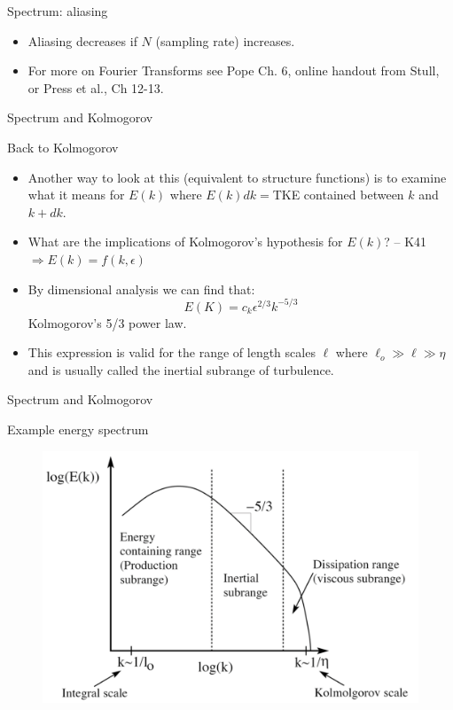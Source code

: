
\begin{frame}{Spectrum: aliasing}
\begin{itemize}
	\item Aliasing decreases if $N$ (sampling rate) increases.
	\item For more on Fourier Transforms see Pope Ch. 6, online handout from Stull, or Press et al., Ch 12-13.
\end{itemize}
\end{frame}

\begin{frame}{Spectrum and Kolmogorov}

Back to Kolmogorov
\begin{itemize}
	\item Another way to look at this (equivalent to structure functions) is to examine what it means for $E(k)$ where $E(k)dk =$TKE contained between $k$ and $k+dk$.
	\item What are the implications of Kolmogorov’s hypothesis for $E(k)$? -- K41$\Rightarrow E(k) = f(k,\epsilon)$
	\item By dimensional analysis we can find that: $$E(K) = c_k \epsilon^{2/3}k^{-5/3}$$ Kolmogorov's 5/3 power law.
	\item This expression is valid for the range of length scales $\ell$ where $\ell_o \gg \ell \gg \eta$ and is usually called the inertial subrange of turbulence.
\end{itemize}
\end{frame}

\begin{frame}{Spectrum and Kolmogorov}

Example energy spectrum
\begin{figure}
	\includegraphics[width=\textwidth]{spectrum2.png}
\end{figure}
\end{frame}















